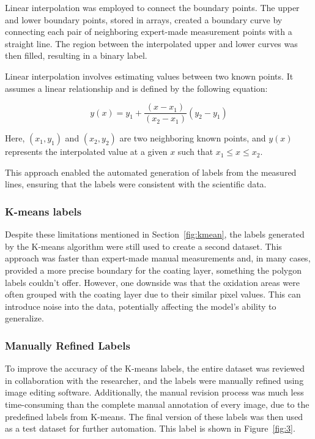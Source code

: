 Linear interpolation was employed to connect the boundary points. The upper and lower boundary points, stored in arrays, created a boundary curve by connecting each pair of neighboring expert-made measurement points with a straight line. The region between the interpolated upper and lower curves was then filled, resulting in a binary label. 

\newpage
Linear interpolation involves estimating values between two known points. It assumes a linear relationship and is defined by the following equation:

\begin{equation}
y(x) = y_1 + \frac{(x - x_1)}{(x_2 - x_1)} (y_2 - y_1)
\end{equation}

Here, $(x_1, y_1)$ and $(x_2, y_2)$ are two neighboring known points, and $y(x)$ represents the interpolated value at a given $x$ such that $x_1 \leq x \leq x_2$. 

This approach enabled the automated generation of labels from the measured lines, ensuring that the labels were consistent with the scientific data.



\subsubsection{K-means labels} \label{sec:means_mask}


Despite these limitations mentioned in Section~\ref{fig:kmean}, the labels generated by the K-means algorithm were still used to create a second dataset. This approach was faster than expert-made manual measurements and, in many cases, provided a more precise boundary for the coating layer, something the polygon labels couldn't offer. However, one downside was that the oxidation areas were often grouped with the coating layer due to their similar pixel values. This can introduce noise into the data, potentially affecting the model’s ability to generalize.
\subsubsection{Manually Refined Labels}


To improve the accuracy of the K-means labels, the entire dataset was reviewed in collaboration with the researcher, and the labels were manually refined using image editing software. Additionally, the manual revision process was much less time-consuming than the complete manual annotation of every image, due to the predefined labels from K-means. The final version of these labels was then used as a test dataset for further automation. This label is shown in Figure~\ref{fig:3}.


